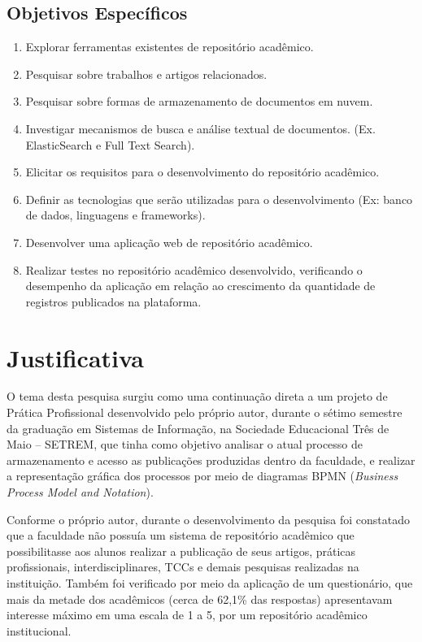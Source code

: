\subsection{Objetivos Específicos}
\begin{enumerate}
      \item Explorar ferramentas existentes de repositório acadêmico.
      \item Pesquisar sobre trabalhos e artigos relacionados.
      \item Pesquisar sobre formas de armazenamento de documentos em nuvem.
      \item Investigar mecanismos de busca e análise textual de documentos. (Ex. ElasticSearch e Full Text Search).
      \item Elicitar os requisitos para o desenvolvimento do repositório acadêmico.
      \item Definir as tecnologias que serão utilizadas para o desenvolvimento (Ex: banco de dados, linguagens e frameworks).
      \item Desenvolver uma aplicação web de repositório acadêmico.
      \item Realizar testes no repositório acadêmico desenvolvido, verificando o desempenho da aplicação em relação ao crescimento da quantidade de registros publicados na plataforma.

\end{enumerate}


\section{Justificativa}\label{sec:justification}

O tema desta pesquisa surgiu como uma continuação direta a um projeto
de Prática Profissional desenvolvido pelo próprio autor, durante o sétimo
semestre da graduação em Sistemas de Informação, na Sociedade Educacional
Três de Maio – SETREM, que tinha como objetivo analisar o atual processo
de armazenamento e acesso as publicações produzidas dentro da faculdade,
e realizar a representação gráfica dos processos por meio de diagramas BPMN
(\emph{Business Process Model and Notation}).

Conforme o próprio autor, durante o desenvolvimento da pesquisa foi constatado que a faculdade
não possuía um sistema de repositório acadêmico que possibilitasse aos
alunos realizar a publicação de seus artigos, práticas profissionais,
interdisciplinares, TCCs e demais pesquisas realizadas na instituição.
Também foi verificado por meio da aplicação de um questionário, que
mais da metade dos acadêmicos (cerca de 62,1\% das respostas) apresentavam
interesse máximo em uma escala de 1 a 5, por um repositório acadêmico
institucional.

